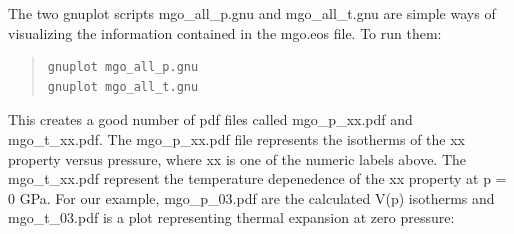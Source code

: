 \documentclass[a4paper]{article}
\begin{document}
The two gnuplot scripts mgo\_all\_p.gnu and mgo\_all\_t.gnu are simple
ways of visualizing the information contained in the mgo.eos file. To
run them:
%
\begin{quote}
\begin{verbatim}
gnuplot mgo_all_p.gnu
gnuplot mgo_all_t.gnu
\end{verbatim}
\end{quote}

This creates a good number of pdf files called mgo\_p\_xx.pdf
and mgo\_t\_xx.pdf. The mgo\_p\_xx.pdf file represents the isotherms of
the xx property versus pressure, where xx is one of the numeric labels
above. The mgo\_t\_xx.pdf represent the temperature depenedence of the
xx property at p = 0 GPa. For our example, mgo\_p\_03.pdf are the
calculated V(p) isotherms and mgo\_t\_03.pdf is a plot representing
thermal expansion at zero pressure:

\noindent{}

\noindent{}
\end{document}

